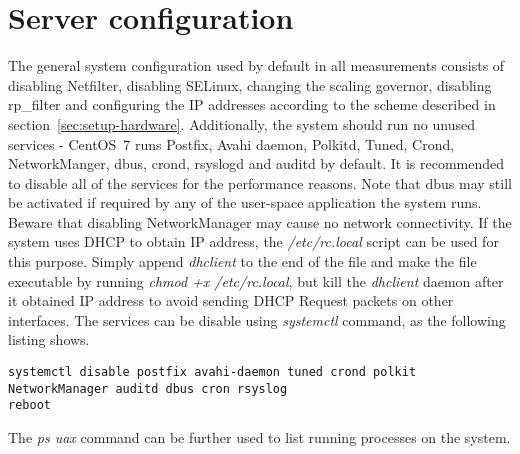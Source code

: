 
\section{Server configuration}\label{sec:setup-server}
The general system configuration used by default in all measurements
consists of disabling Netfilter, disabling SELinux, changing the scaling governor, disabling rp\_filter and
configuring the IP addresses according to the scheme described in section~\ref{sec:setup-hardware}.
Additionally, the system should run no unused services - CentOS~7 runs Postfix, Avahi daemon, Polkitd, Tuned, Crond,
NetworkManger, dbus, crond, rsyslogd and auditd by default.
It is recommended to disable all of the services for the performance reasons.
Note that dbus may still be activated if required by any of the user-space application the system runs.
Beware that disabling NetworkManager may cause no network connectivity.
If the system uses DHCP to obtain IP address, the {\it{/etc/rc.local}} script can be used for this purpose.
Simply append {\it{dhclient}} to the end of the file and make the file executable by running {\it{chmod +x /etc/rc.local}},
but kill the {\it{dhclient}} daemon after it obtained IP address to avoid sending DHCP Request packets on other interfaces.
The services can be disable using {\it{systemctl}} command, as the following listing shows.
\newpage
\begin{lstlisting}
systemctl disable postfix avahi-daemon tuned crond polkit NetworkManager auditd dbus cron rsyslog
reboot
\end{lstlisting}
The {\it{ps uax}} command can be further used to list running processes on the system.
\\

